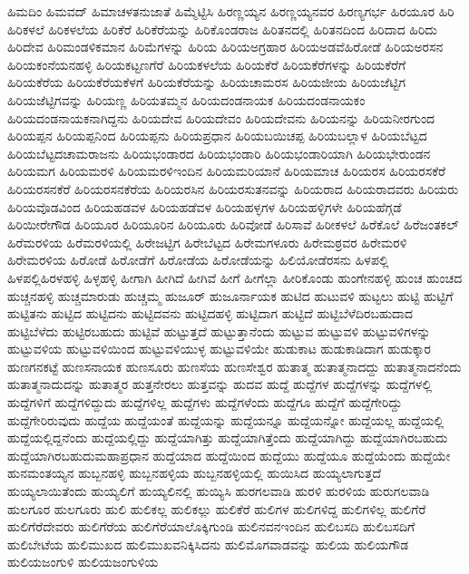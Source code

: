 {ಹಿಮದಿಂ
ಹಿಮವದ್
ಹಿಮಾಚಳತನುಜಾತೆ
ಹಿಮ್ಮೆಟ್ಟಿಸಿ
ಹಿರಣ್ಣಯ್ಯನ
ಹಿರಣ್ಣಯ್ಯನವರ
ಹಿರಣ್ಯಗರ್ಭ
ಹಿರಯೂರ
ಹಿರಿ
ಹಿರಿಕಳಲೆ
ಹಿರಿಕಳಲೆಯ
ಹಿರಿಕೆರೆ
ಹಿರಿಕೆರೆಯನ್ನು
ಹಿರಿಕೊಂಡರಾಜ
ಹಿರಿತನದಲ್ಲಿ
ಹಿರಿತನದಿಂದ
ಹಿರಿದಾದ
ಹಿರಿದು
ಹಿರಿದೇವ
ಹಿರಿಮಂಡಳಿಕಮಾನ
ಹಿರಿಮೆಗಳನ್ನು
ಹಿರಿಯ
ಹಿರಿಯಅಗ್ರಹಾರ
ಹಿರಿಯಅಡವೆಹಿರೋಡೆ
ಹಿರಿಯಅರಸನ
ಹಿರಿಯಕಂನೆಯನಹಳ್ಳಿ
ಹಿರಿಯಕಟ್ಟಣಗೆರೆ
ಹಿರಿಯಕಳಲೆಯ
ಹಿರಿಯಕೆರೆ
ಹಿರಿಯಕೆರೆಗಳನ್ನು
ಹಿರಿಯಕೆರೆಗೆ
ಹಿರಿಯಕೆರೆಯ
ಹಿರಿಯಕೆರೆಯಕೆಳಗೆ
ಹಿರಿಯಕೆರೆಯನ್ನು
ಹಿರಿಯಚಾಮರಸ
ಹಿರಿಯಜೀಯ
ಹಿರಿಯಜೆಟ್ಟಿಗ
ಹಿರಿಯಜೆಟ್ಟಿಗವನ್ನು
ಹಿರಿಯಣ್ಣ
ಹಿರಿಯತಮ್ಮನ
ಹಿರಿಯದಂಡನಾಯಕ
ಹಿರಿಯದಂಡನಾಯಕಂ
ಹಿರಿಯದಂಡನಾಯಕನಾಗಿದ್ದನು
ಹಿರಿಯದೇವ
ಹಿರಿಯದೇವಂ
ಹಿರಿಯದೇವನು
ಹಿರಿಯನನ್ನು
ಹಿರಿಯನೀರಗುಂದ
ಹಿರಿಯಪ್ಪನ
ಹಿರಿಯಪ್ಪನಿಂದ
ಹಿರಿಯಪ್ಪನು
ಹಿರಿಯಪ್ರಧಾನ
ಹಿರಿಯಬಯಿಚಪ್ಪ
ಹಿರಿಯಬಲ್ಲಾಳ
ಹಿರಿಯಬೆಟ್ಟದ
ಹಿರಿಯಬೆಟ್ಟದಚಾಮರಾಜನು
ಹಿರಿಯಭಂಡಾರದ
ಹಿರಿಯಭಂಡಾರಿ
ಹಿರಿಯಭಂಡಾರಿಯಾಗಿ
ಹಿರಿಯಭೇರುಂಡನ
ಹಿರಿಯಮಗ
ಹಿರಿಯಮರಳಿ
ಹಿರಿಯಮರಳಿಇಂದಿನ
ಹಿರಿಯಮರಿಯಾನೆ
ಹಿರಿಯಮಾಚ
ಹಿರಿಯರಸ
ಹಿರಿಯರಸಕೆರೆ
ಹಿರಿಯರಸನಕೆರೆ
ಹಿರಿಯರಸನಕೆರೆಯ
ಹಿರಿಯರಸಿನ
ಹಿರಿಯರಸುತನವನ್ನು
ಹಿರಿಯರಾದ
ಹಿರಿಯರಾದವರು
ಹಿರಿಯರು
ಹಿರಿಯವೊಡವಿಂದ
ಹಿರಿಯಹಡವಳ
ಹಿರಿಯಹಡೆವಳ
ಹಿರಿಯಹಳ್ಳಗಳ
ಹಿರಿಯಹಳ್ಳಿಗಳೇ
ಹಿರಿಯಹೆಗ್ಗಡೆ
ಹಿರಿಯೀರೇಗೌಡ
ಹಿರಿಯೂರ
ಹಿರಿಯೂರಿನ
ಹಿರಿಯೂರು
ಹಿರಿವೋಡೆ
ಹಿರಿಸಾವೆ
ಹಿರೀಕಳಲೆ
ಹಿರೆಕೊಲೆ
ಹಿರೆಜಂತಕಲ್
ಹಿರೆಮರಳಿಯ
ಹಿರೆಮರಳಿಯಲ್ಲಿ
ಹಿರೇಜಟ್ಟಿಗ
ಹಿರೇಬೆಟ್ಟದ
ಹಿರೇಮಗಳೂರು
ಹಿರೇಮಠ್ರವರ
ಹಿರೇಮರಳಿ
ಹಿರೇಮರಳಿಯ
ಹಿರೋಡೆ
ಹಿರೋಡೆಗೆ
ಹಿರೋಡೆಯ
ಹಿರೋಡೆಯನ್ನು
ಹಿಲಿಯೋಡೆರಸನು
ಹಿಳಪಲ್ಲಿ
ಹಿಳಪಲ್ಲಿಹಿರಳಹಳ್ಳಿ
ಹಿಳ್ಳಹಳ್ಳಿ
ಹೀಗಾಗಿ
ಹೀಗಿದೆ
ಹೀಗಿವೆ
ಹೀಗೆ
ಹೀಗೆಲ್ಲಾ
ಹೀರಿಕೊಂಡು
ಹುಂಗೇನಹಳ್ಳಿ
ಹುಂಚ
ಹುಂಚದ
ಹುಚ್ಚನಹಳ್ಳಿ
ಹುಚ್ಚಮಾರುಡು
ಹುಚ್ಚಮ್ಮ
ಹುಜೂರ್
ಹುಜೂರ್ನಾಯಕ
ಹುಟಿದ
ಹುಟುವಳಿ
ಹುಟ್ಟಲು
ಹುಟ್ಟಿ
ಹುಟ್ಟಿಗೆ
ಹುಟ್ಟಿತನು
ಹುಟ್ಟಿದ
ಹುಟ್ಟಿದನು
ಹುಟ್ಟಿದವನು
ಹುಟ್ಟಿದಹಳ್ಳಿ
ಹುಟ್ಟಿದಾಗ
ಹುಟ್ಟಿದೆ
ಹುಟ್ಟಿಬೆಳೆದಿರಬಹುದಾದ
ಹುಟ್ಟಿಬೆಳೆದು
ಹುಟ್ಟಿರಬಹುದು
ಹುಟ್ಟಿವೆ
ಹುಟ್ಟುತ್ತದೆ
ಹುಟ್ಟುತ್ತಾನೆಂದು
ಹುಟ್ಟುವ
ಹುಟ್ಟುವಳಿ
ಹುಟ್ಟುವಳಿಗಳನ್ನು
ಹುಟ್ಟುವಳಿಯ
ಹುಟ್ಟುವಳಿಯಿಂದ
ಹುಟ್ಟುವಳಿಯುಳ್ಳ
ಹುಟ್ಟುವಳಿಯೇ
ಹುಡುಕಾಟ
ಹುಡುಕಾಡಿದಾಗ
ಹುಡುಕ್ಕಾರ
ಹುಣಗನಕಟ್ಟೆ
ಹುಣಸನಾಯಕ
ಹುಣಸೂರು
ಹುಣಸೆಯ
ಹುಣಸೇಶ್ವರ
ಹುತಾತ್ಮ
ಹುತಾತ್ಮನಾದದ್ದು
ಹುತಾತ್ಮನಾದನೆಂದು
ಹುತಾತ್ಮನಾದುದನ್ನು
ಹುತಾತ್ಮರ
ಹುತ್ತನೇರಲು
ಹುತ್ತವನ್ನು
ಹುದವ
ಹುದ್ದೆ
ಹುದ್ದೆಗಳ
ಹುದ್ದೆಗಳನ್ನು
ಹುದ್ದೆಗಳಲ್ಲಿ
ಹುದ್ದೆಗಳಿಗೆ
ಹುದ್ದೆಗಳಿದ್ದುದು
ಹುದ್ದೆಗಳಿಲ್ಲ
ಹುದ್ದೆಗಳು
ಹುದ್ದೆಗಳೆಂದು
ಹುದ್ದೆಗೂ
ಹುದ್ದೆಗೆ
ಹುದ್ದೆಗೇರಿದ್ದು
ಹುದ್ದೆಗೇರಿರುವುದು
ಹುದ್ದೆಯ
ಹುದ್ದೆಯಂತೆ
ಹುದ್ದೆಯನ್ನು
ಹುದ್ದೆಯನ್ನೂ
ಹುದ್ದೆಯನ್ನೋ
ಹುದ್ದೆಯಲ್ಲ
ಹುದ್ದೆಯಲ್ಲಿ
ಹುದ್ದೆಯಲ್ಲಿದ್ದನೆಂದು
ಹುದ್ದೆಯಲ್ಲಿದ್ದು
ಹುದ್ದೆಯಾಗಿತ್ತು
ಹುದ್ದೆಯಾಗಿತ್ತೆಂದು
ಹುದ್ದೆಯಾಗಿದ್ದು
ಹುದ್ದೆಯಾಗಿರಬಹುದು
ಹುದ್ದೆಯಾಗಿರಬಹುದುಮಹಾಪ್ರಧಾನ
ಹುದ್ದೆಯಾದ
ಹುದ್ದೆಯಿಂದ
ಹುದ್ದೆಯು
ಹುದ್ದೆಯೂ
ಹುದ್ದೆಯೆಂದು
ಹುದ್ದೆಯೇ
ಹುನಮಂತಯ್ಯನ
ಹುಬ್ಬನಹಳ್ಳಿ
ಹುಬ್ಬನಹಳ್ಳಿಯ
ಹುಬ್ಬನಹಳ್ಳಿಯಲ್ಲಿ
ಹುಯಿಸಿದ
ಹುಯ್ಯಲಾಗುತ್ತದೆ
ಹುಯ್ಯಲಾಯಿತೆಂದು
ಹುಯ್ಯಲಿಗೆ
ಹುಯ್ಯಲಿನಲ್ಲಿ
ಹುಯ್ಯಿಸಿ
ಹುರಗಲವಾಡಿ
ಹುರಳಿ
ಹುರಳಿಯ
ಹುರುಗಲವಾಡಿ
ಹುಲಗೂರ
ಹುಲಗೂರು
ಹುಲಿ
ಹುಲಿಕಲ್ಲ
ಹುಲಿಕಲ್ಲು
ಹುಲಿಕೆರೆ
ಹುಲಿಗಳ
ಹುಲಿಗಳಿದ್ದ
ಹುಲಿಗಳಿಲ್ಲ
ಹುಲಿಗೆರೆ
ಹುಲಿಗೆರೆದೇವರು
ಹುಲಿಗೆರೆಯ
ಹುಲಿಗೆರೆಯಾಲೊಕ್ಕಿಗುಂಡಿ
ಹುಲಿನವನಇಂದಿನ
ಹುಲಿಬಸದಿ
ಹುಲಿಬಸದಿಗೆ
ಹುಲಿಬೇಟೆಯ
ಹುಲಿಮುಖದ
ಹುಲಿಮುಖವನಿಕ್ಕಿಸಿದನು
ಹುಲಿಮೊಗವಾಡವನ್ನು
ಹುಲಿಯ
ಹುಲಿಯಗೌಡ
ಹುಲಿಯಜಂಗುಳಿ
ಹುಲಿಯಜಂಗುಳಿಯ
}
